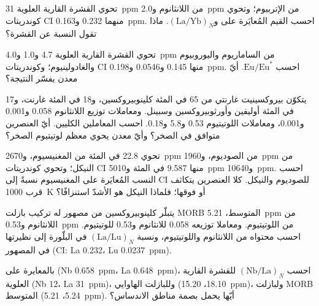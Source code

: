 \begin{exercise}[$\star$]\label{exo:b2:elements-in-the-earth:3}
تحوي القشرة القارية العلوية \qty{31}{ppm} من اللانثانوم و\qty{2.0}{ppm}
من الإتربيوم؛ وتحوي كوندريتات CI منهما 0.232 و\qty{0.163}{ppm}. احسب
القيم المُعايَرة على  و$(\mathrm{La}/\mathrm{Yb})_N$. ماذا تقول
النسبة عن القشرة؟
\end{exercise}

\begin{exercise}[$\star$]\label{exo:b2:elements-in-the-earth:4}
تحوي القشرة القارية العلوية 4.7 و1.0 و\qty{4.0}{ppm} من الساماريوم
واليوروبيوم والغادولينيوم؛ وكوندريتات CI منها 0.145 و0.0546 و\qty{0.198}{ppm}.
احسب $\mathrm{Eu}/\mathrm{Eu}^*$. أيّ معدن يفسّر النتيجة؟
\end{exercise}

\begin{exercise}[$\star\star$]\label{exo:b2:elements-in-the-earth:5}
يتكوّن بيروكسينيت غارنتي من 65 في المئة كلينوبيروكسين، و18 في المئة غارنت،
و17 في المئة أوليفين وأورثوبيروكسين وسبينل. ومعاملات توزيع
اللانثانوم 0.058 و0.001 و0.001، ومعاملات اللوتيتيوم 0.53 و5.8 و0.18.
احسب المعاملين الكليين. أيّ العنصرين متوافق في الصخر؟ وأيّ
معدن يحوي معظم لوتيتيوم الصخر؟
\end{exercise}

\begin{exercise}[$\star\star$]\label{exo:b2:elements-in-the-earth:6}
تحوي  22.8 في المئة من المغنيسيوم، و\qty{2670}{ppm} من
الصوديوم، و\qty{1960}{ppm} من النيكل؛ وتحوي كوندريتات CI منها 9.587 في المئة
و\qty{5010}{ppm} و\qty{10640}{ppm}. احسب النسب المُعايَرة على المغنيسيوم نسبةً إلى CI
للصوديوم والنيكل. كلا العنصرين يتكاثف قرب \qty{1000}{K} أو فوقها؛ فلماذا
النيكل هو الأشدّ استنزافًا؟
\end{exercise}

\begin{exercise}[$\star\star$]\label{exo:b2:elements-in-the-earth:7}
يتبلّر كلينوبيروكسين من مصهور له تركيب بازلت MORB المتوسط،
\qty{5.21}{ppm} من اللانثانوم و\qty{0.53}{ppm} من اللوتيتيوم. ومعاملا
توزيعه 0.058 للانثانوم و0.53 للوتيتيوم. احسب محتواه من
اللانثانوم واللوتيتيوم، ونسبة $(\mathrm{La}/\mathrm{Lu})_N$
في البلّورة إلى نظيرتها في المصهور (CI: La 0.232، Lu \qty{0.0237}{ppm}).
\end{exercise}

\begin{exercise}[$\star\star$]\label{exo:b2:elements-in-the-earth:8}
بالمعايرة على  (Nb \qty{0.658}{ppm}، La \qty{0.648}{ppm})،
احسب $(\mathrm{Nb}/\mathrm{La})_N$ للقشرة القارية العلوية (Nb 12،
La \qty{31}{ppm})، وللبازلت الهاوايي (18.10، \qty{15.20}{ppm})، ولبازلت MORB المتوسط
(5.24، \qty{5.21}{ppm}). أيّها يحمل بصمة مناطق الاندساس؟
\end{exercise}

